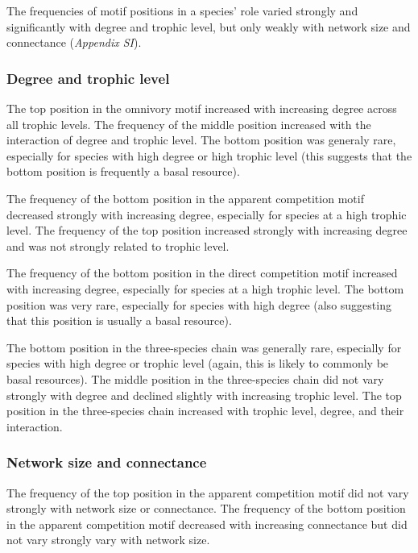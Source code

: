 \documentclass[12pt]{article}
\begin{document}
\begin{spacing}{2.0}
        The frequencies of motif positions in a species' role varied strongly and significantly with degree and trophic level, but only weakly with network size and connectance (\emph{Appendix SI}).
    
    
           \subsubsection*{Degree and trophic level}
        
            The top position in the omnivory motif increased with increasing degree across all trophic levels.
            The frequency of the middle position increased with the interaction of degree and trophic level.
            The bottom position was generaly rare, especially for species with high degree or high trophic level (this suggests that the bottom position is frequently a basal resource).
            
            
            The frequency of the bottom position in the apparent competition motif decreased strongly with increasing degree, especially for species at a high trophic level.
            The frequency of the top position increased strongly with increasing degree and was not strongly related to trophic level.
            
            
            The frequency of the bottom position in the direct competition motif increased with increasing degree, especially for species at a high trophic level.
            The bottom position was very rare, especially for species with high degree (also suggesting that this position is usually a basal resource).
            
            
            The bottom position in the three-species chain was generally rare, especially for species with high degree or trophic level (again, this is likely to commonly be basal resources).
            The middle position in the three-species chain did not vary strongly with degree and declined slightly with increasing trophic level.
            The top position in the three-species chain increased with trophic level, degree, and their interaction. 
        
    
        \subsubsection*{Network size and connectance}

            The frequency of the top position in the apparent competition motif did not vary strongly with network size or connectance.
            The frequency of the bottom position in the apparent competition motif decreased with increasing connectance but did not vary strongly vary with network size.
            

\end{spacing}
\end{document}
